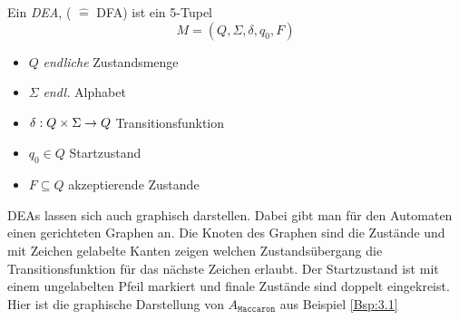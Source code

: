 \begin{Def}
        Ein \emph{\acf{DEA}}, ( $\hat=$ \acl{DFA}) ist ein 5-Tupel
        \[ M= (Q,\Sigma,\delta,q_0,F) \]
        \begin{itemize}
                \item $Q$ \emph{endliche} Zustandsmenge
                \item $\Sigma$ \emph{endl.} Alphabet
                \item $\delta:Q\x\Sigma\->Q$ Transitionsfunktion
                \item $q_0\in Q$ Startzustand
                \item $F\subseteq Q$ akzeptierende Zustande
        \end{itemize}
\end{Def}

DEAs lassen sich auch graphisch darstellen.
Dabei gibt man für den Automaten einen gerichteten Graphen an.
Die Knoten des Graphen sind die Zustände und mit Zeichen gelabelte Kanten zeigen welchen Zustandsübergang die Transitionsfunktion für das nächste Zeichen erlaubt.
Der Startzustand ist mit einem ungelabelten Pfeil markiert und finale Zustände sind doppelt eingekreist.
Hier ist die graphische Darstellung von $A_{\mathtt{Maccaron}}$ aus Beispiel \ref{Bsp:3.1}

\begin{center}
\end{center}

